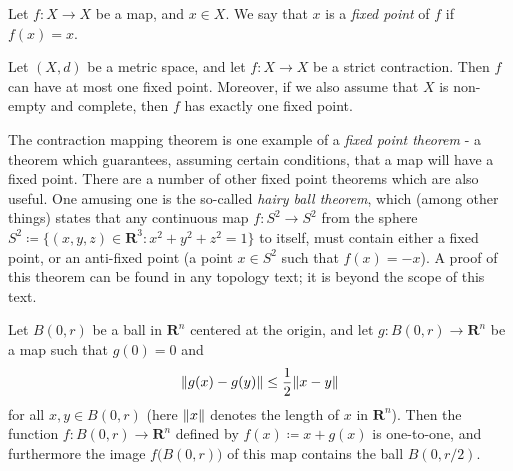 \begin{definition}\label{6.6.3}
    Let \(f : X \to X\) be a map, and \(x \in X\).
    We say that \(x\) is a \emph{fixed point} of \(f\) if \(f(x) = x\).
\end{definition}

\begin{theorem}\label{6.6.4}
    Let \((X, d)\) be a metric space, and let \(f : X \to X\) be a strict contraction.
    Then \(f\) can have at most one fixed point.
    Moreover, if we also assume that \(X\) is non-empty and complete, then \(f\) has exactly one fixed point.
\end{theorem}

\begin{remark}\label{6.6.5}
    The contraction mapping theorem is one example of a \emph{fixed point theorem}
    - a theorem which guarantees, assuming certain conditions, that a map will have a fixed point.
    There are a number of other fixed point theorems which are also useful.
    One amusing one is the so-called \emph{hairy ball theorem}, which (among other things) states that any continuous map \(f : S^2 \to S^2\) from the sphere \(S^2 \coloneqq \{(x, y, z) \in \mathbf{R}^3 : x^2 + y^2 + z^2 = 1\}\) to itself, must contain either a fixed point, or an anti-fixed point
    (a point \(x \in S^2\) such that \(f(x) = -x\)).
    A proof of this theorem can be found in any topology text;
    it is beyond the scope of this text.
\end{remark}

\begin{lemma}\label{6.6.6}
    Let \(B(0, r)\) be a ball in \(\mathbf{R}^n\) centered at the origin, and let \(g : B(0, r) \to \mathbf{R}^n\) be a map such that \(g(0) = 0\) and
    \[
        \norm*{g(x) - g(y)} \leq \frac{1}{2} \norm*{x - y}
    \]
    for all \(x, y \in B(0, r)\)
    (here \(\norm*{x}\) denotes the length of \(x\) in \(\mathbf{R}^n\)).
    Then the function \(f : B(0, r) \to \mathbf{R}^n\) defined by \(f(x) \coloneqq x + g(x)\) is one-to-one, and furthermore the image \(f\big(B(0, r)\big)\) of this map contains the ball \(B(0, r / 2)\).
\end{lemma}

